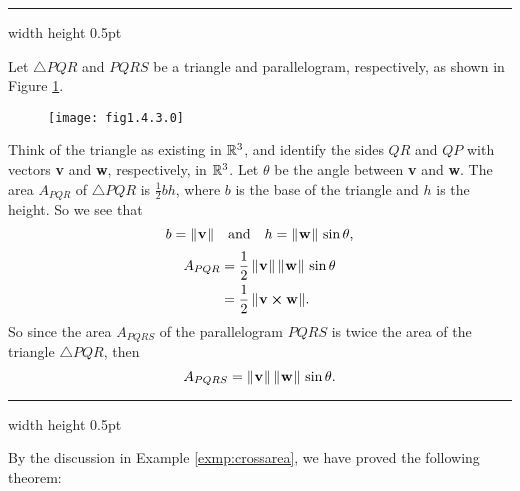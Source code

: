 \medskip
\hrule width \textwidth height 0.5pt
\begin{exmp}\label{exmp:crossarea}
 Let $\triangle PQR$ and $PQRS$ be a triangle and parallelogram, respectively, as shown in Figure \ref{fig:crossarea}.

 \begin{figure}[h]
 \begin{center}
  \texttt{[image: fig1.4.3.0]}
 \end{center}
 \caption[]{}
 \label{fig:crossarea}
\end{figure}

 Think of the triangle as existing in $\mathbb{R}^{3}$, and identify the sides $QR$ and $QP$ with vectors \textbf{v} and
 \textbf{w}, respectively, in $\mathbb{R}^{3}$. Let $\theta$ be the angle between \textbf{v} and \textbf{w}. The area
 $A_{PQR}$ of $\triangle PQR$ is $\frac{1}{2} b h$, where $b$ is the base of the triangle and $h$ is the height. So
 we see that
 \begin{displaymath}
  b = \lVert\mspace{1mu}\textbf{v}\mspace{1mu}\rVert \quad \text{and} \quad h = \lVert\mspace{1mu}\textbf{w}\mspace{1mu}\rVert\,\sin \theta,
 \end{displaymath}
 \begin{align*}
  A_{PQR} &= \frac{1}{2}\,\lVert\mspace{1mu}\textbf{v}\mspace{1mu}\rVert\,\lVert\mspace{1mu}\textbf{w}\mspace{1mu}\rVert\,\sin \theta
  \\
  &= \frac{1}{2}\,\lVert\mspace{1mu}\textbf{v} \bm{\times} \textbf{w}\mspace{1mu}\rVert.
 \end{align*}
 So since the area $A_{PQRS}$ of the parallelogram $PQRS$ is twice the area of the triangle $\triangle PQR$, then
 \begin{displaymath}
  A_{PQRS} = \lVert\mspace{1mu}\textbf{v}\mspace{1mu}\rVert\,\lVert\mspace{1mu}\textbf{w}\mspace{1mu}\rVert\,\sin \theta.
 \end{displaymath}
\end{exmp}
\hrule width \textwidth height 0.5pt
\medskip

By the discussion in Example \ref{exmp:crossarea}, we have proved the following theorem:

